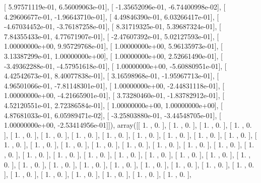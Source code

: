 \documentclass{article}
\begin{document}
       [  5.97571119e-01,   6.56009063e-01],
       [ -1.35652096e-01,  -6.74400998e-02],
       [  4.29606677e-01,  -1.96643710e-01],
       [  4.49846390e-01,   6.03266417e-01],
       [ -4.67034452e-01,  -3.76187258e-01],
       [  8.31719325e-01,   5.39687324e-01],
       [  7.84355433e-01,   4.77671907e-01],
       [ -2.47607392e-01,   5.02127593e-01],
       [  1.00000000e+00,   9.95729768e-01],
       [  1.00000000e+00,   5.96135973e-01],
       [  3.13387299e-01,   1.00000000e+00],
       [  1.00000000e+00,   2.52661490e-01],
       [ -3.49362288e-01,  -4.57951618e-01],
       [  1.00000000e+00,  -5.60880951e-01],
       [  4.42542673e-01,   8.40077838e-01],
       [  3.16598968e-01,  -1.95967713e-01],
       [  4.96501066e-01,  -7.81148301e-01],
       [  1.00000000e+00,  -2.44831118e-01],
       [  1.00000000e+00,  -4.21665901e-01],
       [  3.73280460e-01,  -1.83782912e-01],
       [  4.52120551e-01,   2.72386584e-01],
       [  1.00000000e+00,   1.00000000e+00],
       [  4.87681033e-01,   6.05989471e-02],
       [ -3.25803880e-01,  -3.44548705e-01],
       [  1.00000000e+00,  -2.53414956e-01]]), array([[ 1.        ,  0.        ],
       [ 1.        ,  0.        ],
       [ 1.        ,  0.        ],
       [ 1.        ,  0.        ],
       [ 1.        ,  0.        ],
       [ 1.        ,  0.        ],
       [ 1.        ,  0.        ],
       [ 1.        ,  0.        ],
       [ 1.        ,  0.        ],
       [ 1.        ,  0.        ],
       [ 1.        ,  0.        ],
       [ 1.        ,  0.        ],
       [ 1.        ,  0.        ],
       [ 1.        ,  0.        ],
       [ 1.        ,  0.        ],
       [ 1.        ,  0.        ],
       [ 1.        ,  0.        ],
       [ 1.        ,  0.        ],
       [ 1.        ,  0.        ],
       [ 1.        ,  0.        ],
       [ 1.        ,  0.        ],
       [ 1.        ,  0.        ],
       [ 1.        ,  0.        ],
       [ 1.        ,  0.        ],
       [ 1.        ,  0.        ],
       [ 1.        ,  0.        ],
       [ 1.        ,  0.        ],
       [ 1.        ,  0.        ],
       [ 1.        ,  0.        ],
       [ 1.        ,  0.        ],
       [ 1.        ,  0.        ],
       [ 1.        ,  0.        ],
       [ 1.        ,  0.        ],
       [ 1.        ,  0.        ],
       [ 1.        ,  0.        ],
       [ 1.        ,  0.        ],
       [ 1.        ,  0.        ],
       [ 1.        ,  0.        ],
       [ 1.        ,  0.        ],
       [ 1.        ,  0.        ],
       [ 1.        ,  0.        ],
       [ 1.        ,  0.        ],
       [ 1.        ,  0.        ],
\end{document}
